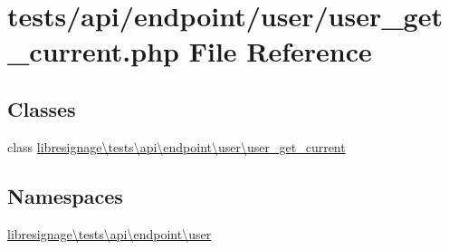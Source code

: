 \hypertarget{tests_2api_2endpoint_2user_2user__get__current_8php}{}\section{tests/api/endpoint/user/user\+\_\+get\+\_\+current.php File Reference}
\label{tests_2api_2endpoint_2user_2user__get__current_8php}
\subsection*{Classes}
\begin{DoxyCompactItemize}
\item 
class \hyperlink{classlibresignage_1_1tests_1_1api_1_1endpoint_1_1user_1_1user__get__current}{libresignage\textbackslash{}tests\textbackslash{}api\textbackslash{}endpoint\textbackslash{}user\textbackslash{}user\+\_\+get\+\_\+current}
\end{DoxyCompactItemize}
\subsection*{Namespaces}
\begin{DoxyCompactItemize}
\item 
 \hyperlink{namespacelibresignage_1_1tests_1_1api_1_1endpoint_1_1user}{libresignage\textbackslash{}tests\textbackslash{}api\textbackslash{}endpoint\textbackslash{}user}
\end{DoxyCompactItemize}
